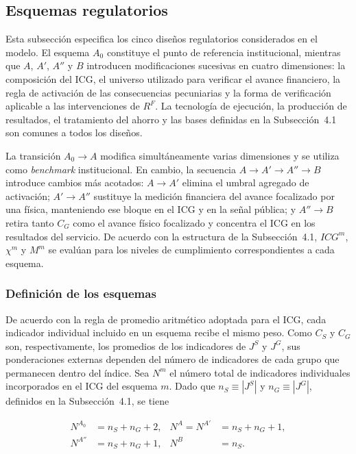 \subsection{Esquemas regulatorios}

Esta subsección especifica los cinco diseños regulatorios considerados en el modelo. El esquema \(A_0\) constituye el punto de referencia institucional, mientras que \(A\), \(A'\), \(A''\) y \(B\) introducen modificaciones sucesivas en cuatro dimensiones: la composición del ICG, el universo utilizado para verificar el avance financiero, la regla de activación de las consecuencias pecuniarias y la forma de verificación aplicable a las intervenciones de \(R^{F}\). La tecnología de ejecución, la producción de resultados, el tratamiento del ahorro y las bases definidas en la Subsección~4.1 son comunes a todos los diseños.

La transición \(A_0\to A\) modifica simultáneamente varias dimensiones y se utiliza como \textit{benchmark} institucional. En cambio, la secuencia \(A\to A'\to A''\to B\) introduce cambios más acotados: \(A\to A'\) elimina el umbral agregado de activación; \(A'\to A''\) sustituye la medición financiera del avance focalizado por una física, manteniendo ese bloque en el ICG y en la señal pública; y \(A''\to B\) retira tanto \(C_G\) como el avance físico focalizado y concentra el ICG en los resultados del servicio. De acuerdo con la estructura de la Subsección~4.1, \(ICG^m\), \(\chi^m\) y \(M^m\) se evalúan para los niveles de cumplimiento correspondientes a cada esquema.

\subsubsection{Definición de los esquemas}

De acuerdo con la regla de promedio aritmético adoptada para el ICG, cada indicador individual incluido en un esquema recibe el mismo peso. Como \(C_S\) y \(C_G\) son, respectivamente, los promedios de los indicadores de \(J^{S}\) y \(J^{G}\), sus ponderaciones externas dependen del número de indicadores de cada grupo que permanecen dentro del índice. Sea \(N^m\) el número total de indicadores individuales incorporados en el ICG del esquema \(m\). Dado que \(n_S\equiv|J^{S}|\) y \(n_G\equiv|J^{G}|\), definidos en la Subsección~4.1, se tiene

\begin{equation}
\label{eq:numero_componentes_icg}
\begin{aligned}
N^{A_0}
&=
n_S+n_G+2,
&
N^{A}
=
N^{A'}
&=
n_S+n_G+1,
\\
N^{A''}
&=
n_S+n_G+1,
&
N^{B}
&=
n_S.
\end{aligned}
\end{equation}

